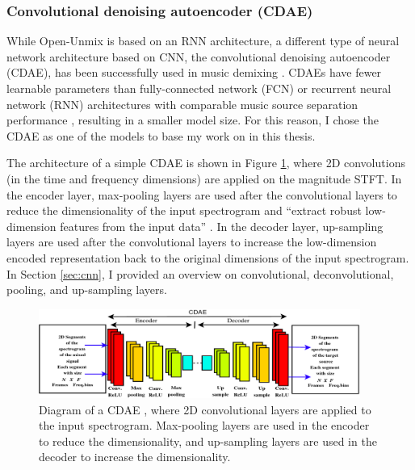 \documentclass[report.tex]{subfiles}
\begin{document}
\subsubsection{Convolutional denoising autoencoder (CDAE)}
\label{sec:cdae}

While Open-Unmix is based on an RNN architecture, a different type of neural network architecture based on CNN, the convolutional denoising autoencoder (CDAE), has been successfully used in music demixing \parencite{plumbley1, plumbley2}. CDAEs have fewer learnable parameters than fully-connected network (FCN) or recurrent neural network (RNN) architectures with comparable music source separation performance \parencite{plumbley1}, resulting in a smaller model size. For this reason, I chose the CDAE as one of the models to base my work on in this thesis.

The architecture of a simple CDAE is shown in Figure \ref{fig:cdaes}, where 2D convolutions (in the time and frequency dimensions) are applied on the magnitude STFT. In the encoder layer, max-pooling layers are used after the convolutional layers to reduce the dimensionality of the input spectrogram and ``extract robust low-dimension features from the input data'' \parencite[1]{plumbley1}. In the decoder layer, up-sampling layers are used after the convolutional layers to increase the low-dimension encoded representation back to the original dimensions of the input spectrogram. In Section \ref{sec:cnn}, I provided an overview on convolutional, deconvolutional, pooling, and up-sampling layers.

\begin{figure}[ht]
	\centering
	\includegraphics[width=0.9375\textwidth]{./images-neural/cdae_1.png}
	\caption{Diagram of a CDAE {\parencite[2]{plumbley1}}, where 2D convolutional layers are applied to the input spectrogram. Max-pooling layers are used in the encoder to reduce the dimensionality, and up-sampling layers are used in the decoder to increase the dimensionality.}
	\label{fig:cdaes}
\end{figure}
\end{document}
